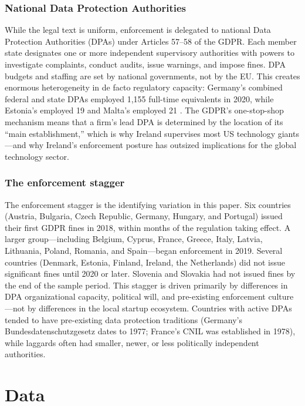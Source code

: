\documentclass[12pt]{article}
\begin{document}
\subsubsection*{National Data Protection Authorities} While the legal text is uniform, enforcement is delegated to national Data Protection Authorities (DPAs) under Articles 57--58 of the GDPR. Each member state designates one or more independent supervisory authorities with powers to investigate complaints, conduct audits, issue warnings, and impose fines. DPA budgets and staffing are set by national governments, not by the EU. This creates enormous heterogeneity in de facto regulatory capacity: Germany's combined federal and state DPAs employed 1,155 full-time equivalents in 2020, while Estonia's employed 19 and Malta's employed 21 \citep{edpb2022}. The GDPR's one-stop-shop mechanism means that a firm's lead DPA is determined by the location of its ``main establishment,'' which is why Ireland supervises most US technology giants---and why Ireland's enforcement posture has outsized implications for the global technology sector.

\subsubsection*{The enforcement stagger} The enforcement stagger is the identifying variation in this paper. Six countries (Austria, Bulgaria, Czech Republic, Germany, Hungary, and Portugal) issued their first GDPR fines in 2018, within months of the regulation taking effect. A larger group---including Belgium, Cyprus, France, Greece, Italy, Latvia, Lithuania, Poland, Romania, and Spain---began enforcement in 2019. Several countries (Denmark, Estonia, Finland, Ireland, the Netherlands) did not issue significant fines until 2020 or later. Slovenia and Slovakia had not issued fines by the end of the sample period. This stagger is driven primarily by differences in DPA organizational capacity, political will, and pre-existing enforcement culture---not by differences in the local startup ecosystem. Countries with active DPAs tended to have pre-existing data protection traditions (Germany's Bundesdatenschutzgesetz dates to 1977; France's CNIL was established in 1978), while laggards often had smaller, newer, or less politically independent authorities.

\section{Data}
\end{document}
